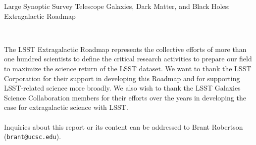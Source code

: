 \documentclass[11pt,fleqn]{book} %
\begin{document}

\begingroup
\thispagestyle{empty}
{\Huge Large Synoptic Survey Telescope} 
\linebreak 
\linebreak 
{\Huge Galaxies, Dark Matter, and Black Holes: Extragalactic Roadmap}
\linebreak
\linebreak
{\centering


}
\vfill
\endgroup

\newpage
\thispagestyle{empty}
\noindent
\noindent
\noindent
\\
\noindent

The LSST Extragalactic Roadmap represents the collective efforts of more than one hundred scientists to define the critical research activities to prepare our field to maximize
the science return of the LSST dataset. We want to thank the LSST Corporation for their
support in developing this Roadmap and for supporting LSST-related science more broadly.
We also wish to thank the LSST Galaxies Science Collaboration members for their efforts
over the years in developing the case for extragalactic science with LSST.\\\\
Inquiries about this report or its content can be addressed to Brant Robertson ({\tt brant@ucsc.edu}).
\end{document}

